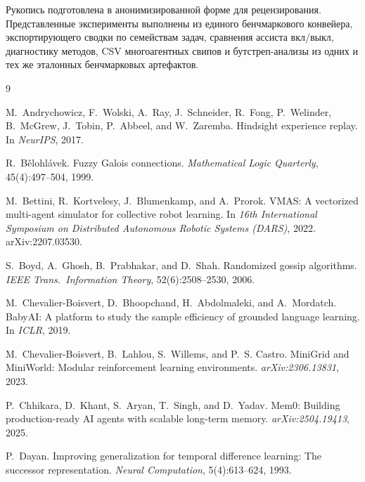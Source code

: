 \documentclass{article}
\begin{document}
\begin{ack}
Рукопись подготовлена в анонимизированной форме для рецензирования.
Представленные эксперименты выполнены из единого бенчмаркового конвейера,
экспортирующего сводки по семействам задач, сравнения ассиста вкл/выкл, диагностику
методов, CSV многоагентных свипов и бутстреп-анализы из
одних и тех же эталонных бенчмарковых артефактов.
\end{ack}

{\small
\begin{thebibliography}{9}

M.~Andrychowicz, F.~Wolski, A.~Ray, J.~Schneider, R.~Fong, P.~Welinder, B.~McGrew, J.~Tobin, P.~Abbeel, and W.~Zaremba.
\newblock Hindsight experience replay.
\newblock In \emph{NeurIPS}, 2017.

R.~B\v{e}lohl\'avek.
\newblock Fuzzy Galois connections.
\newblock \emph{Mathematical Logic Quarterly}, 45(4):497--504, 1999.

M.~Bettini, R.~Kortvelesy, J.~Blumenkamp, and A.~Prorok.
\newblock VMAS: A vectorized multi-agent simulator for collective robot learning.
\newblock In \emph{16th International Symposium on Distributed Autonomous Robotic Systems (DARS)}, 2022.
\newblock arXiv:2207.03530.

S.~Boyd, A.~Ghosh, B.~Prabhakar, and D.~Shah.
\newblock Randomized gossip algorithms.
\newblock \emph{IEEE Trans.\ Information Theory}, 52(6):2508--2530, 2006.

M.~Chevalier-Boisvert, D.~Bhoopchand, H.~Abdolmaleki, and A.~Mordatch.
\newblock BabyAI: A platform to study the sample efficiency of grounded language learning.
\newblock In \emph{ICLR}, 2019.

M.~Chevalier-Boisvert, B.~Lahlou, S.~Willems, and P.~S. Castro.
\newblock MiniGrid and MiniWorld: Modular reinforcement learning environments.
\newblock \emph{arXiv:2306.13831}, 2023.

P.~Chhikara, D.~Khant, S.~Aryan, T.~Singh, and D.~Yadav.
\newblock Mem0: Building production-ready AI agents with scalable long-term memory.
\newblock \emph{arXiv:2504.19413}, 2025.

P.~Dayan.
\newblock Improving generalization for temporal difference learning: The successor representation.
\newblock \emph{Neural Computation}, 5(4):613--624, 1993.


\end{thebibliography}}
\end{document}
